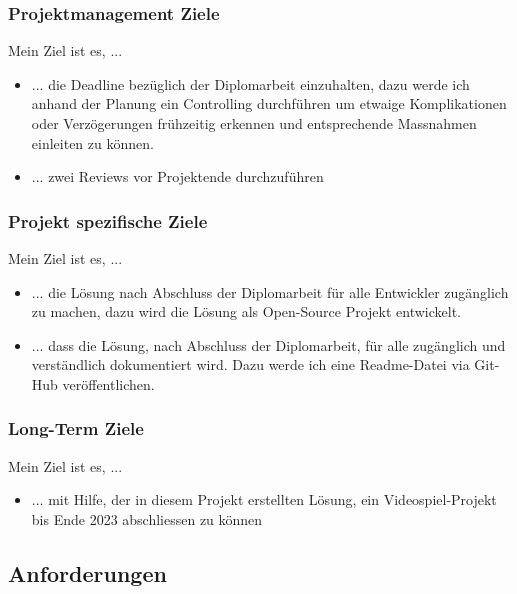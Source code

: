 \subsubsection{Projektmanagement Ziele}
Mein Ziel ist es, ...
\begin{itemize}
    \item ... die Deadline bezüglich der Diplomarbeit einzuhalten, dazu werde ich anhand der Planung ein Controlling durchführen um etwaige Komplikationen oder Verzögerungen frühzeitig erkennen und entsprechende Massnahmen einleiten zu können.
    \item ... zwei Reviews vor Projektende durchzuführen
\end{itemize}

\subsubsection{Projekt spezifische Ziele}
Mein Ziel ist es, ...
\begin{itemize}
    \item ... die Lösung nach Abschluss der Diplomarbeit für alle Entwickler zugänglich zu machen, dazu wird die Lösung als Open-Source Projekt entwickelt.
    \item ... dass die Lösung, nach Abschluss der Diplomarbeit, für alle zugänglich und verständlich dokumentiert wird. Dazu werde ich eine Readme-Datei via Git-Hub veröffentlichen.
\end{itemize}

\subsubsection{Long-Term Ziele}
Mein Ziel ist es, ...
\begin{itemize}
  \item ... mit Hilfe, der in diesem Projekt erstellten Lösung, ein Videospiel-Projekt bis Ende 2023 abschliessen zu können
\end{itemize}


\newpage
\subsection{Anforderungen}
